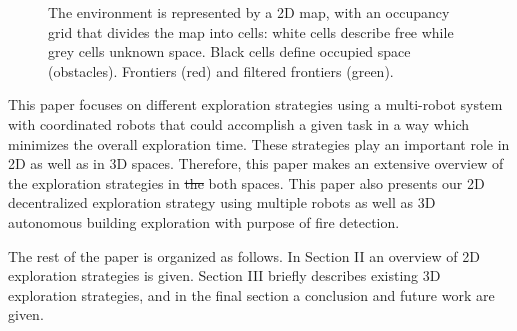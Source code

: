 \begin{figure}[t!]
	\centering
	\caption {The environment is represented by a 2D map, with an occupancy grid that divides the map into cells: white cells describe free while grey cells unknown space. Black cells define occupied space (obstacles). Frontiers (red) and filtered frontiers (green).}
	\label{fig:environment}
\end{figure}

This paper focuses on different exploration strategies using {\color{red}a} multi-robot system with coordinated robots that could accomplish a given task in a way which minimizes the overall exploration time. These strategies play an important role in 2D as well as in 3D spaces. Therefore, this paper makes an extensive overview of the exploration strategies in \st{the} both spaces. This paper also presents our 2D decentralized exploration strategy using multiple robots as well as 3D autonomous building exploration with purpose of fire detection.

The rest of the paper is organized as follows. 
In Section II an overview of 2D exploration strategies is given. Section III briefly describes existing 3D exploration strategies, and in the final section a conclusion and future work are given.
